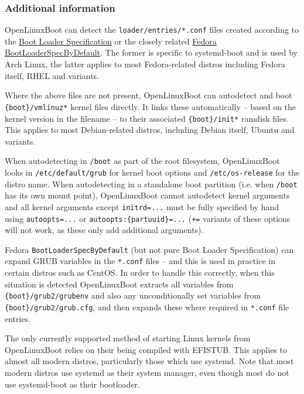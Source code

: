 \documentclass[]{article}
\begin{document}
\subsubsection{Additional information}

OpenLinuxBoot can detect the \texttt{loader/entries/*.conf} files created according to the
\href{https://systemd.io/BOOT_LOADER_SPECIFICATION/}{Boot Loader Specification} or the closely related
\href{https://fedoraproject.org/wiki/Changes/BootLoaderSpecByDefault}{Fedora BootLoaderSpecByDefault}. The
former is specific to systemd-boot and is used by Arch Linux, the latter applies to most Fedora-related distros
including Fedora itself, RHEL and variants.

Where the above files are not present, OpenLinuxBoot can autodetect and
boot \texttt{\{boot\}/vmlinuz*} kernel files directly. It links these automatically -- based on the
kernel version in the filename -- to their associated \texttt{\{boot\}/init*} ramdisk files.
This applies to most Debian-related distros, including Debian itself, Ubuntu and variants.

When autodetecting in \texttt{/boot} as part of the root filesystem, OpenLinuxBoot looks in \texttt{/etc/default/grub}
for kernel boot options and \texttt{/etc/os-release} for the distro name. When autodetecting in a standalone boot
partition (i.e. when \texttt{/boot} has its own mount point), OpenLinuxBoot cannot autodetect kernel arguments and
all kernel arguments except \texttt{initrd=...} must be fully specified by hand using \texttt{autoopts=...} or
\texttt{autoopts:\{partuuid\}=...} (\texttt{+=} variants of these options will not work, as these only add additional
arguments).

Fedora \texttt{BootLoaderSpecByDefault} (but not pure Boot Loader Specification) can expand GRUB variables
in the \texttt{*.conf} files -- and this is used in practice in certain distros such as CentOS.
In order to handle this correctly, when this situation is detected OpenLinuxBoot extracts all variables from
\texttt{\{boot\}/grub2/grubenv} and also any unconditionally set variables from
\texttt{\{boot\}/grub2/grub.cfg}, and then expands these where required in \texttt{*.conf} file entries.

The only currently supported method of starting Linux kernels from OpenLinuxBoot relies on their being compiled with EFISTUB.
This applies to almost all modern distros, particularly those which use systemd. Note that most modern
distros use systemd as their system manager, even though most do not use systemd-boot as
their bootloader.
\end{document}
